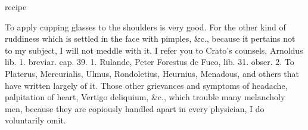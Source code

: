 \begin{Prescription}
{%
\noindent{}%
\par\noindent{}
}
\caption{ recipe}
\end{Prescription}

To apply cupping glasses to the shoulders is very good. For the
other kind of ruddiness which is settled in the face with pimples, \&c.,
because it pertains not to my subject, I will not meddle with it. I
refer you to Crato's counsels, Arnoldus lib. 1. breviar. cap. 39. 1.
Rulande, Peter Forestus de Fuco, lib. 31. obser. 2. To Platerus,
Mercurialis, Ulmus, Rondoletius, Heurnius, Menadous, and others that
have written largely of it.
Those other grievances and symptoms of headache, palpitation of heart,
Vertigo deliquium, \&c., which trouble many melancholy men, because they
are copiously handled apart in every physician, I do voluntarily omit.

